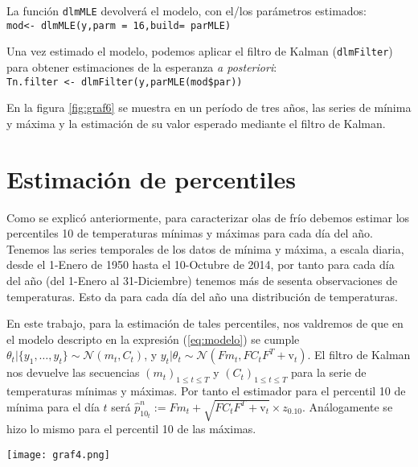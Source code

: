 \documentclass{article}
\begin{document}
La función \verb|dlmMLE| devolverá el modelo, con el/los parámetros estimados:\\
\verb|mod<- dlmMLE(y,parm = 16,build= parMLE)|

Una vez estimado el modelo, podemos aplicar el filtro de Kalman (\verb|dlmFilter|) para obtener estimaciones de la esperanza \textit{a posteriori}:\\
\verb|Tn.filter <- dlmFilter(y,parMLE(mod$par))|

En la figura \ref{fig:graf6} se muestra en un período de tres años, las series de mínima y máxima y la estimación de su valor esperado mediante el filtro de Kalman.

\section{Estimación de percentiles}

Como se explicó anteriormente, para caracterizar olas de frío debemos estimar los percentiles 10 de temperaturas mínimas y máximas para cada día del año. Tenemos las series temporales de los datos de mínima y máxima, a escala diaria, desde el 1-Enero de 1950 hasta el 10-Octubre de 2014, por tanto para cada día del año (del 1-Enero al 31-Diciembre) tenemos más de sesenta observaciones de temperaturas. Esto da para cada día del año una distribución de temperaturas.  %

En este trabajo, para la estimación de tales percentiles, nos valdremos de que en el modelo descripto en la expresión (\ref{eq:modelo}) se cumple $\theta_t | \{y_1,\dots,y_t\} \sim \mathcal{N}(m_t,C_t)$, y $y_t|\theta_t \sim \mathcal{N}(Fm_t,FC_tF^T + \text{v}_t)$. El filtro de Kalman nos devuelve las secuencias $(m_t)_{1\leq t \leq T}$ y $(C_t)_{1\leq t \leq T}$ para la serie de temperaturas mínimas y máximas. Por tanto el estimador para el percentil 10 de mínima para el día $t$ será $\hat{p}^n_{10_t}:=Fm_t+\sqrt{FC_tF^T + \text{v}_t}\times z_{0.10}$. Análogamente se hizo lo mismo para el percentil 10 de las máximas.

\begin{center}
\texttt{[image: graf4.png]}
\label{fig:graf4}
\end{center}
\end{document}

